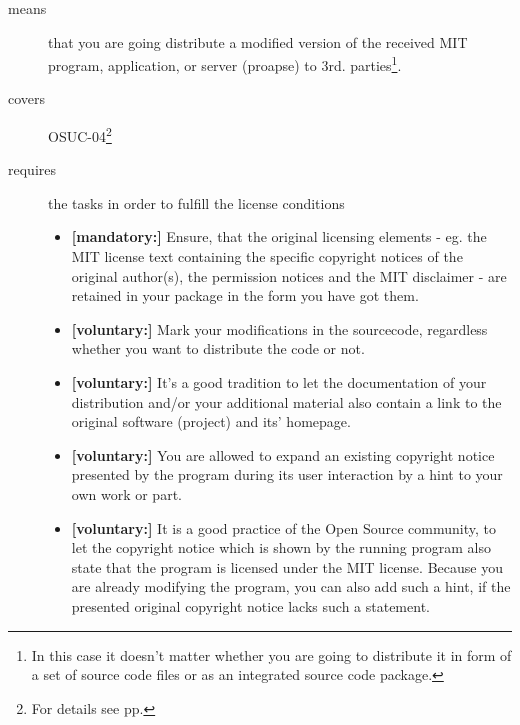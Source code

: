 \begin{description}
\item[means] that you are going distribute a modified version of the received
MIT program, application, or server (proapse) to 3rd. parties\footnote{In this
case it doesn't matter whether you are going to distribute it in form of a set
of source code files or as an integrated source code package.}.
\item[covers] OSUC-04\footnote{For details see pp. \pageref{OSUC-04-DEF}}
\item[requires] the tasks in order to fulfill the license conditions
\begin{itemize}
  \item \textbf{[mandatory:]} Ensure, that the original licensing elements - eg.
  the MIT license text containing the specific copyright notices of the original
  author(s), the permission notices and the MIT disclaimer - are retained in
  your package in the form you have got them.
  \item \textbf{[voluntary:]} Mark your modifications in the sourcecode,
  regardless whether you want to distribute the code or not.
  \item \textbf{[voluntary:]} It's a good tradition to let the documentation of
  your distribution and/or your additional material also contain a link to the
  original software (project) and its' homepage.
  \item \textbf{[voluntary:]} You are allowed to expand an existing copyright
  notice presented by the program during its user interaction by a hint to your
  own work or part.
  \item \textbf{[voluntary:]} It is a good practice of the Open Source
  community, to let the copyright notice which is shown by the running program
  also state that the program is licensed under the MIT license. Because you are
  already modifying the program, you can also add such a hint, if the presented
  original copyright notice lacks such a statement.
\end{itemize}
\end{description}

